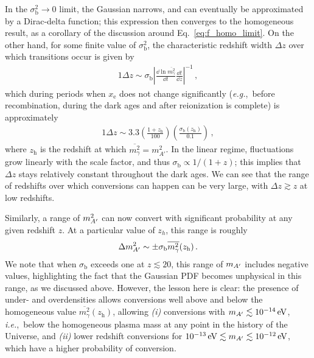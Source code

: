 \documentclass[prd,aps,10pt,nofootinbib,twocolumn,superscriptaddress,preprintnumbers,balancelastpage,longbibliography]{revtex4-1}
\begin{document}
In the $\sigma_\text{b}^2 \to 0$ limit, the Gaussian narrows, and can eventually be approximated by a Dirac-delta function; this expression then converges to the homogeneous result, as a corollary of the discussion around Eq.~\eqref{eq:f_homo_limit}. On the other hand, for some finite value of $\sigma_\text{b}^2$, the characteristic redshift width $\Delta z$ over which transitions occur is given by
%
\begin{alignat}{1}
    \Delta z \sim \sigma_\text{b} \left| \frac{\dd \ln \overline{m_\gamma^2}}{\dd t} \frac{\dd t}{\dd z} \right|^{-1} \,,
    \label{eq:z_range_of_conversion_less_approx}
\end{alignat}
%
which during periods when $x_\text{e}$ does not change significantly (\emph{e.g.},\ before recombination, during the dark ages and after reionization is complete) is approximately
%
\begin{alignat}{1}
    \Delta z \sim 3.3 \left(\frac{1+z_\text{h}}{100}\right) \left( \frac{\sigma_\text{b}(z_\text{h})}{0.1} \right) \,,
    \label{eq:z_range_of_conversion}
\end{alignat}
%
where $z_\text{h}$ is the redshift at which $\overline{m_\gamma^2} = m_{A'}^2$. 
In the linear regime, fluctuations grow linearly with the scale factor, and thus $\sigma_\text{b} \propto 1/(1+z)$; this implies that $\Delta z$ stays relatively constant throughout the dark ages.
We can see that the range of redshifts over which conversions can happen can be very large, with $\Delta z \gtrsim z$ at low redshifts. 

Similarly, a range of $m_{A^\prime}^2$ can now convert with significant probability at any given redshift $z$. At a particular value of $z_h$, this range is roughly
%
\begin{alignat}{1}
    \Delta m_{A^\prime}^2 \sim \pm \sigma_\text{b} \overline{m_\gamma^2}(z_\text{h}) \,.
\end{alignat}
%
We note that when $\sigma_\text{b}$ exceeds one at $z \lesssim 20$, this range of $m_{A^\prime}$ includes negative values, highlighting the fact that the Gaussian PDF becomes unphysical in this range, as we discussed above. 
However, the lesson here is clear: the presence of under- and overdensities allows conversions well above and below the homogeneous value $\overline{m_\gamma^2}(z_\text{h})$, allowing \emph{(i)} conversions with $\mAp \lesssim \SI{e-14}{\eV}$, \emph{i.e.},\ below the homogeneous plasma mass at any point in the history of the Universe, and \emph{(ii)} lower redshift conversions for $\SI{e-13}{\eV} \lesssim \mAp \lesssim \SI{e-12}{\eV}$, which have a higher probability of conversion. 
\end{document}
